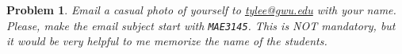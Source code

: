 \documentclass[10pt]{article}
\renewcommand{\baselinestretch}{1.2}
\theoremstyle{plain}\theorembodyfont{\normalfont}
\newtheorem{prob}{Problem}[section]
\begin{document}
\begin{prob}
Email a casual photo of yourself to \url{tylee@gwu.edu} with your name. Please, make the email subject start with \texttt{MAE3145}.  This is NOT mandatory, but it would be very helpful to me memorize the name of the students. 
\end{prob}

%
%
%
%
\end{document}
